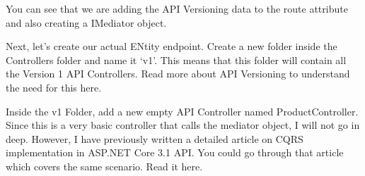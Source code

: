 \documentclass[letterpaper,10pt,english]{sphinxmanual}
\begin{document}
\begin{sphinxVerbatim}[commandchars=\\\{\}]
 
 
 
 
 
\PYG{n+na}{    [Route(\PYGZdq{}api/v\PYGZob{}version:apiVersion\PYGZcb{}/[controller]}\PYG{l+s}{\PYGZdq{})]}
         
          
              
\end{sphinxVerbatim}

You can see that we are adding the API Versioning data to the route attribute and also creating a IMediator object.

Next, let’s create our actual ENtity endpoint. Create a new folder inside the Controllers folder and name it ‘v1’. This means that this folder will contain all the Version 1 API Controllers. Read more about API Versioning to understand the need for this here.

Inside the v1 Folder, add a new empty API Controller named ProductController. Since this is a very basic controller that calls the mediator object, I will not go in deep. However, I have previously written a detailed article on CQRS implementation in ASP.NET Core 3.1 API. You could go through that article which covers the same scenario. Read it here.
\end{document}
